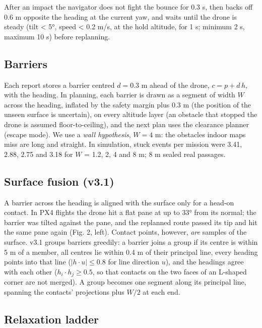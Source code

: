 \documentclass[
]{article}
\begin{document}
After an impact the navigator does not fight the bounce for 0.3 s, then
backs off 0.6 m opposite the heading at the current yaw, and waits until
the drone is steady (tilt \textless{} 5°, speed \textless{} 0.2 m/s, at
the hold altitude, for 1 s; minimum 2 s, maximum 10 s) before
replanning.

\subsection{Barriers}\label{barriers}

Each report stores a barrier centred \(d = 0.3\) m ahead of the drone,
\(c = p + d\,h\), with the heading. In planning, each barrier is drawn
as a segment of width \(W\) across the heading, inflated by the safety
margin plus 0.3 m (the position of the unseen surface is uncertain), on
every altitude layer (an obstacle that stopped the drone is assumed
floor-to-ceiling), and the next plan uses the clearance planner (escape
mode). We use a \emph{wall hypothesis}, \(W = 4\) m: the obstacles
indoor maps miss are long and straight. In simulation, stuck events per
mission were 3.41, 2.88, 2.75 and 3.18 for \(W\) = 1.2, 2, 4 and 8 m; 8
m sealed real passages.

\subsection{Surface fusion (v3.1)}\label{surface-fusion-v3.1}

A barrier across the heading is aligned with the surface only for a
head-on contact. In PX4 flights the drone hit a flat pane at up to 33°
from its normal; the barrier was tilted against the pane, and the
replanned route passed its tip and hit the same pane again (Fig. 2,
left). Contact points, however, \emph{are} samples of the surface. v3.1
groups barriers greedily: a barrier joins a group if its centre is
within 5 m of a member, all centres lie within 0.4 m of their principal
line, every heading points into that line (\(|h\cdot u| \le 0.8\) for
line direction \(u\)), and the headings agree with each other
(\(h_i\cdot h_j \ge 0.5\), so that contacts on the two faces of an
L-shaped corner are not merged). A group becomes one segment along its
principal line, spanning the contacts' projections plus \(W/2\) at each
end.

\subsection{Relaxation ladder}\label{relaxation-ladder}
\end{document}
